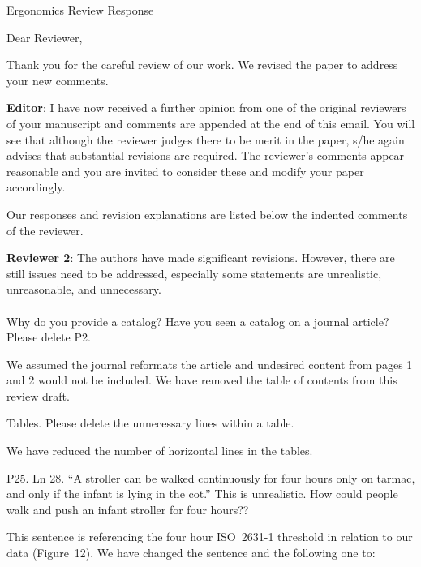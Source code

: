 \documentclass[a4paper]{letter}
\date{January 20, 2026}
\begin{document}
\begin{letter}{Ergonomics Review Response}
\opening{Dear Reviewer,}

Thank you for the careful review of our work. We revised the paper to address
your new comments.

\begin{displayquote}
  \textbf{Editor}: I have now received a further opinion from one of the
  original reviewers of your manuscript and comments are appended at the end of
  this email. You will see that although the reviewer judges there to be merit
  in the paper, s/he again advises that substantial revisions are required. The
  reviewer's comments appear reasonable and you are invited to consider these
  and modify your paper accordingly.
\end{displayquote}

Our responses and revision explanations are listed below the indented comments
of the reviewer. 

\begin{displayquote}
  \textbf{Reviewer 2}: The authors have made significant revisions. However,
  there are still issues need to be addressed, especially some statements are
  unrealistic, unreasonable, and unnecessary.
  \\\\
  Why do you provide a catalog? Have you seen a catalog on a journal article?
  Please delete P2.
\end{displayquote}

We assumed the journal reformats the article and undesired content from pages 1
and 2 would not be included. We have removed the table of contents from this
review draft.
 
\begin{displayquote}
  Tables. Please delete the unnecessary lines within a table.
\end{displayquote}

We have reduced the number of horizontal lines in the tables.

\begin{displayquote}
    P25. Ln 28. ``A stroller can be walked continuously for four hours only on
    tarmac, and only if the infant is lying in the cot.'' This is unrealistic.
    How could people walk and push an infant stroller for four hours??
\end{displayquote}

This sentence is referencing the four hour ISO~2631-1 threshold in relation to
our data (Figure~12). We have changed the sentence and the following one to:


\end{letter}
\end{document}
